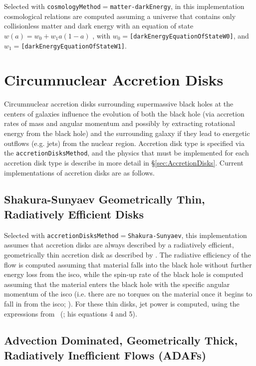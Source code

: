 Selected with {\tt cosmologyMethod}$=${\tt matter-darkEnergy}, in this implementation cosmological relations are computed assuming a universe that contains only collisionless matter and dark energy with an equation of state $w(a)=w_0+w_1a(1-a)$ \citep{jassal_wmap_2005}, with $w_0=${\tt [darkEnergyEquationOfStateW0]}, and $w_1=${\tt [darkEnergyEquationOfStateW1]}.

\section{Circumnuclear Accretion Disks}\label{sec:CircumnuclearDisks}

Circumnuclear accretion disks surrounding supermassive black holes at the centers of galaxies influence the evolution of both the black hole (via accretion rates of mass and angular momentum and possibly by extracting rotational energy from the black hole) and the surrounding galaxy if they lead to energetic outflows (e.g. jets) from the nuclear region. Accretion disk type is specified via the {\tt accretionDisksMethod}, and the physics that must be implemented for each accretion disk type is describe in more detail in \S\ref{sec:AccretionDisks}. Current implementations of accretion disks are as follows.

\subsection{Shakura-Sunyaev Geometrically Thin, Radiatively Efficient Disks}

Selected with {\tt accretionDisksMethod}$=${\tt Shakura-Sunyaev}, this implementation assumes that accretion disks are always described by a radiatively efficient, geometrically thin accretion disk as described by \cite{shakura_black_1973}. The radiative efficiency of the flow is computed assuming that material falls into the black hole without further energy loss from the \gls{isco}, while the spin-up rate of the black hole is computed assuming that the material enters the black hole with the specific angular momentum of the \gls{isco} (i.e. there are no torques on the material once it begins to fall in from the \gls{isco}; \citealt{bardeen_kerr_1970}). For these thin disks, jet power is computed, using the expressions from \citeauthor{meier_association_2001}~(\citeyear{meier_association_2001}; his equations 4 and 5).

\subsection{Advection Dominated, Geometrically Thick, Radiatively Inefficient Flows (ADAFs)}

